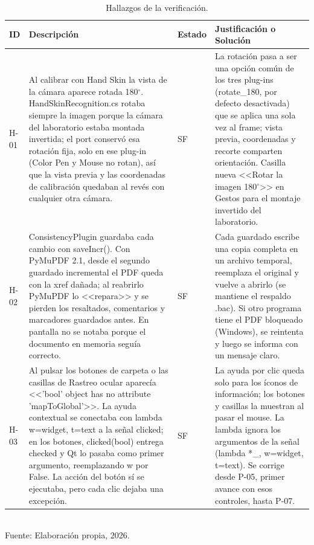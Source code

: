 \begin{table}[h!]
\centering
\caption{Hallazgos de la verificación.}
\label{tab:hallazgos}
\begin{tabularx}{\textwidth}{|l|X|l|X|}
\hline
ID & Descripción & Estado & Justificación o Solución \\ \hline
H-01 & Al calibrar con Hand Skin la vista de la cámara aparece rotada 180$^{\circ}$. HandSkinRecognition.cs rotaba siempre la imagen porque la cámara del laboratorio estaba montada invertida; el port conservó esa rotación fija, solo en ese plug-in (Color Pen y Mouse no rotan), así que la vista previa y las coordenadas de calibración quedaban al revés con cualquier otra cámara. & SF & La rotación pasa a ser una opción común de los tres plug-ins (rotate\_180, por defecto desactivada) que se aplica una sola vez al frame; vista previa, coordenadas y recorte comparten orientación. Casilla nueva <<Rotar la imagen 180$^{\circ}$>> en Gestos para el montaje invertido del laboratorio. \\ \hline
H-02 & ConsistencyPlugin guardaba cada cambio con saveIncr(). Con PyMuPDF 2.1, desde el segundo guardado incremental el PDF queda con la xref dañada; al reabrirlo PyMuPDF lo <<repara>> y se pierden los resaltados, comentarios y marcadores guardados antes. En pantalla no se notaba porque el documento en memoria seguía correcto. & SF & Cada guardado escribe una copia completa en un archivo temporal, reemplaza el original y vuelve a abrirlo (se mantiene el respaldo .bac). Si otro programa tiene el PDF bloqueado (Windows), se reintenta y luego se informa con un mensaje claro. \\ \hline
H-03 & Al pulsar los botones de carpeta o las casillas de Rastreo ocular aparecía <<'bool' object has no attribute 'mapToGlobal'>>. La ayuda contextual se conectaba con lambda w=widget, t=text a la señal clicked; en los botones, clicked(bool) entrega checked y Qt lo pasaba como primer argumento, reemplazando w por False. La acción del botón sí se ejecutaba, pero cada clic dejaba una excepción. & SF & La ayuda por clic queda solo para los íconos de información; los botones y casillas la muestran al pasar el mouse. La lambda ignora los argumentos de la señal (lambda *\_, w=widget, t=text). Se corrige desde P-05, primer avance con esos controles, hasta P-07. \\ \hline
\end{tabularx}
\\[2pt] {\small Fuente: Elaboración propia, 2026.}
\end{table}
